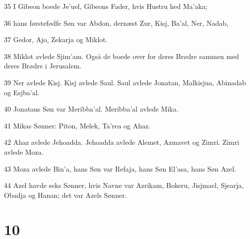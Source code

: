 \par 35 I Gibeon boede Je'uel, Gibeons Fader, hvis Hustru hed Ma'aka;
\par 36 hans førstefødfe Søn var Abdon, dernæst Zur, Kisj, Ba'al, Ner, Nadab,
\par 37 Gedor, Ajo, Zekarja og Miklot.
\par 38 Miklot avlede Sjim'am. Også de boede over for deres Brødre sammen med deres Brødre i Jerusalem.
\par 39 Ner avlede Kisj. Kisj avlede Saul. Saul avlede Jonatan, Malkisjua, Abinadab og Esjba'al.
\par 40 Jonatans Søn var Meribba'al. Meribba'al avlede Mika.
\par 41 Mikas Sønner: Piton, Melek, Ta'rea og Ahaz.
\par 42 Ahaz avlede Jehoadda. Jehoadda avlede Alemet, Azmavet og Zimri. Zimri avlede Moza.
\par 43 Moza avlede Bin'a, hans Søn var Refaja, hans Søn El'asa, hans Søn Azel.
\par 44 Azel havde seks Sønner, hvis Navne var Azrikam, Bokeru, Jisjmael, Sjearja, Obadja og Hanan; det var Azels Sønner.

\chapter{10}


